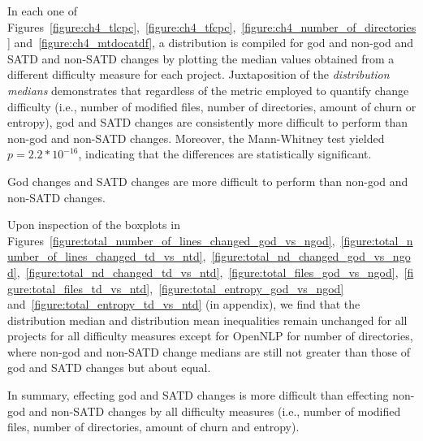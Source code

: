 


In each one of Figures~\ref{figure:ch4_tlcpc},~\ref{figure:ch4_tfcpc},~\ref{figure:ch4_number_of_directories} and~\ref{figure:ch4_mtdocatdf}, a distribution is compiled for god and non-god and SATD and non-SATD changes by plotting the median values obtained from a different difficulty measure for each project. Juxtaposition of the \textit{distribution medians} demonstrates that regardless of the metric employed to quantify change difficulty (i.e., number of modified files, number of directories, amount of churn or entropy), god and SATD changes are consistently more difficult to perform than non-god and non-SATD changes. Moreover, the Mann-Whitney test \cite{mann1947test} yielded $p=2.2\ast 10^{-16}$, indicating that the differences are statistically significant.\\

\begin{myboxii}
	God changes and SATD changes are more difficult to perform than non-god and non-SATD changes.
\end{myboxii}

Upon inspection of the boxplots in Figures~\ref{figure:total_number_of_lines_changed_god_vs_ngod},~\ref{figure:total_number_of_lines_changed_td_vs_ntd},~\ref{figure:total_nd_changed_god_vs_ngod},~\ref{figure:total_nd_changed_td_vs_ntd},~\ref{figure:total_files_god_vs_ngod},~\ref{figure:total_files_td_vs_ntd},~\ref{figure:total_entropy_god_vs_ngod} and~\ref{figure:total_entropy_td_vs_ntd} (in appendix), we find that the distribution median and distribution mean inequalities remain unchanged for all projects for all difficulty measures except for OpenNLP for number of directories, where non-god and non-SATD change medians are still not greater than those of god and SATD changes but about equal.

In summary, effecting god and SATD changes is more difficult than effecting non-god and non-SATD changes by all difficulty measures (i.e., number of modified files, number of directories, amount of churn and entropy).


\subsection*{\chapterIVrqIV}


